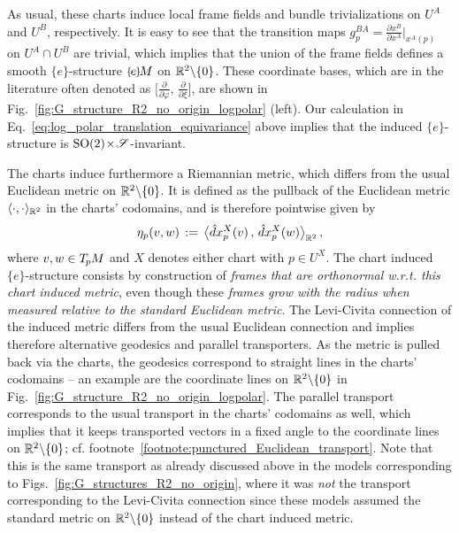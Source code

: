 As usual, these charts induce local frame fields and bundle trivializations on $U^A$ and $U^B$, respectively.
It is easy to see that the transition maps $g_p^{BA} = \frac{\partial x^B}{\partial x^A} |_{x^A(p)}$ on $U^A \cap U^B$ are trivial, which implies that the union of the frame fields defines a smooth $\{e\}$-structure $\eM$ on $\mathbb{R}^2 \backslash \{0\}$.
These coordinate bases, which are in the literature often denoted as $\big[ \frac{\partial}{\partial \varphi} ,\, \frac{\partial}{\partial \xi} \big]$, are shown in Fig.~\ref{fig:G_structure_R2_no_origin_logpolar} (left).
Our calculation in Eq.~\eqref{eq:log_polar_translation_equivariance} above implies that the induced $\{e\}$-structure is ${\operatorname{SO}(2) \!\times\! \mathscr{S}}$-invariant.


The charts induce furthermore a Riemannian metric, which differs from the usual Euclidean metric on $\mathbb{R}^2 \backslash \{0\}$.
It is defined as the pullback of the Euclidean metric $\langle \cdot,\cdot \rangle_{\mathbb{R}^2}$ in the charts' codomains, and is therefore pointwise given by
\begin{align}
    \eta_p(v,w) \,:=\, \big\langle \hat{d}x^X_p(v) \,,\, \hat{d}x^X_p(w) \big\rangle_{\mathbb{R}^2} \,,
\end{align}
where $v,w \in T_{\mkern-1.5mu p}\mkern-.5muM$ and $X$ denotes either chart with $p\in U^X$.
The chart induced $\{e\}$-structure consists by construction of \emph{frames that are orthonormal w.r.t. this chart induced metric}, even though these \emph{frames grow with the radius when measured relative to the standard Euclidean metric}.
The Levi-Civita connection of the induced metric differs from the usual Euclidean connection and implies therefore alternative geodesics and parallel transporters.
As the metric is pulled back via the charts, the geodesics correspond to straight lines in the charts' codomains -- an example are the coordinate lines on $\mathbb{R}^2 \backslash \{0\}$ in Fig.~\ref{fig:G_structure_R2_no_origin_logpolar}.
The parallel transport corresponds to the usual transport in the charts' codomains as well, which implies that it keeps transported vectors in a fixed angle to the coordinate lines on $\mathbb{R}^2 \backslash \{0\}$; cf. footnote~\ref{footnote:punctured_Euclidean_transport}.
Note that this is the same transport as already discussed above in the models corresponding to Figs.~\ref{fig:G_structures_R2_no_origin}, where it was \emph{not} the transport corresponding to the Levi-Civita connection since these models assumed the standard metric on $\mathbb{R}^2 \backslash \{0\}$ instead of the chart induced metric.


